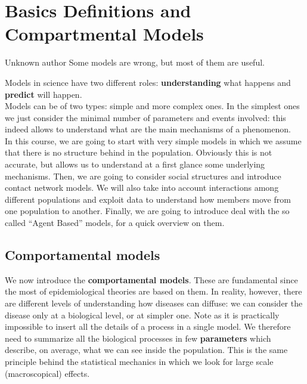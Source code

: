 \documentclass[../main/main.tex]{subfiles}
\begin{document}
\chapter{Basics Definitions and Compartmental Models}

\begin{chapquote}{Unknown author}
Some models are wrong, but most of them are useful.
\end{chapquote}



Models in science have two different roles: \textbf{understanding} what happens and \textbf{predict} will happen.\\
Models can be of two types: simple and more complex ones. In the simplest ones we just consider the minimal number of parameters and events involved: this indeed allows to understand what are the main mechanisms of a phenomenon.\\

In this course, we are going to start with very simple models in which we assume that there is no structure behind in the population. Obviously this is not accurate, but allows us to understand at a first glance some underlying mechanisms.
Then, we are going to consider social structures and introduce contact network models. We will also take into account interactions among different populations and exploit data to understand how members move from one population to another. Finally, we are going to introduce deal with the so called “Agent Based” models, for a quick overview on them.

\section{Comportamental models}

We now introduce the \textbf{comportamental models}. These are fundamental since the most of epidemiological theories are based on them. In reality, however, there are different levels of understanding how diseases can diffuse: we can consider the disease only at a biological level, or at simpler one. Note as it is practically impossible to insert all the details of a process in a single model. We therefore need to summarize all the biological processes in few \textbf{parameters} which describe, on average, what we can see inside the population. This is the same principle behind the statistical mechanics in which we look for large scale (macroscopical) effects.
\end{document}
